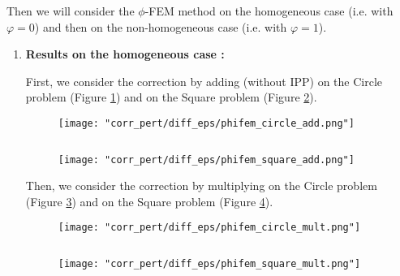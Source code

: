 Then we will consider the $\phi$-FEM method on the homogeneous case (i.e. with $\varphi=0$) and then on the non-homogeneous case (i.e. with $\varphi=1$).

\begin{enumerate}[label=\textbullet]
	\item \textbf{Results on the homogeneous case :}
	
	First, we consider the correction by adding (without IPP) on the Circle problem (Figure \ref{corr_pert_phifem_circle_add}) and on the Square problem (Figure \ref{corr_pert_phifem_square_add}).
	
	\begin{minipage}{0.48\linewidth}
		\begin{figure}[H]
			\centering
			\texttt{[image: "corr\_pert/diff\_eps/phifem\_circle\_add.png"]}
			\label{corr_pert_phifem_circle_add}
		\end{figure} 
	\end{minipage} $\qquad$
	\begin{minipage}{0.48\linewidth}
		\begin{figure}[H]
			\centering
			\texttt{[image: "corr\_pert/diff\_eps/phifem\_square\_add.png"]}
			\label{corr_pert_phifem_square_add}
		\end{figure} 
	\end{minipage}
	
	Then, we consider the correction by multiplying on the Circle problem (Figure \ref{corr_pert_phifem_circle_mult}) and on the Square problem (Figure \ref{corr_pert_phifem_square_mult}).
	
	\begin{minipage}{0.48\linewidth}
		\begin{figure}[H]
			\centering
			\texttt{[image: "corr\_pert/diff\_eps/phifem\_circle\_mult.png"]}
			\label{corr_pert_phifem_circle_mult}
		\end{figure} 
	\end{minipage} $\qquad$
	\begin{minipage}{0.48\linewidth}
		\begin{figure}[H]
			\centering
			\texttt{[image: "corr\_pert/diff\_eps/phifem\_square\_mult.png"]}
			\label{corr_pert_phifem_square_mult}
		\end{figure} 
	\end{minipage}
	

\end{enumerate}
